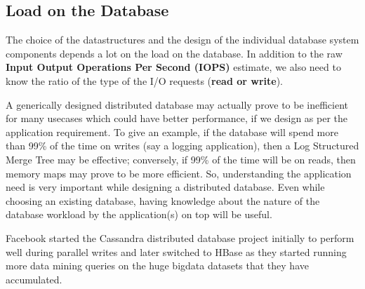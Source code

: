 \subsection{Load on the Database}

The choice of the datastructures and the design of the individual database system components depends a lot on the load on the database. In addition to the raw \textbf{Input Output Operations Per Second (IOPS)} estimate, we also need to know the ratio of the type of the I/O requests (\textbf{read or write}). 

A generically designed distributed database may actually prove to be inefficient for many usecases which could have better performance, if we design as per the application requirement. To give an example, if the database will spend more than 99\% of the time on writes (say a logging application), then a Log Structured Merge Tree \cite{O_Neil_1996} may be effective; conversely, if 99\% of the time will be on reads, then memory maps may prove to be more efficient. So, understanding the application need is very important while designing a distributed database. Even while choosing an existing database, having knowledge about the nature of the database workload by the application(s) on top will be useful.

Facebook started the Cassandra\cite{Lakshman_2009} distributed database project initially to perform well during parallel writes and later switched to HBase as they started running more data mining queries on the huge bigdata datasets that they have accumulated.
